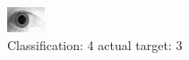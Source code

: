 \begin{figure}[h!]
\begin{center}
\includegraphics[width=0.60\columnwidth]{figures/ID1885_class_4_target_3.png}
\end{center}
\caption{ Classification: 4 actual target: 3}
\label{fig:ID1885_class_4_target_3}
\end{figure}
